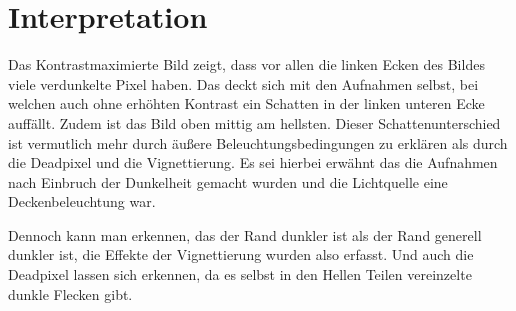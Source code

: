 \section{Interpretation}
\label{chap:VERSUCH_3_INTERPRETATION}

Das Kontrastmaximierte Bild zeigt, dass vor allen die linken Ecken des Bildes viele verdunkelte Pixel haben. Das deckt sich mit den Aufnahmen selbst, bei welchen auch ohne erhöhten Kontrast ein Schatten in der linken unteren Ecke auffällt.
Zudem ist das Bild oben mittig am hellsten.
Dieser Schattenunterschied ist vermutlich mehr durch äußere Beleuchtungsbedingungen zu erklären als durch die Deadpixel und  die Vignettierung. Es sei hierbei erwähnt das die Aufnahmen nach Einbruch der Dunkelheit gemacht wurden und die Lichtquelle eine Deckenbeleuchtung war.

Dennoch kann man erkennen, das der Rand dunkler ist als der Rand generell dunkler ist, die Effekte der Vignettierung wurden also erfasst.
Und auch die Deadpixel lassen sich erkennen, da es selbst in den Hellen Teilen vereinzelte dunkle Flecken gibt.
